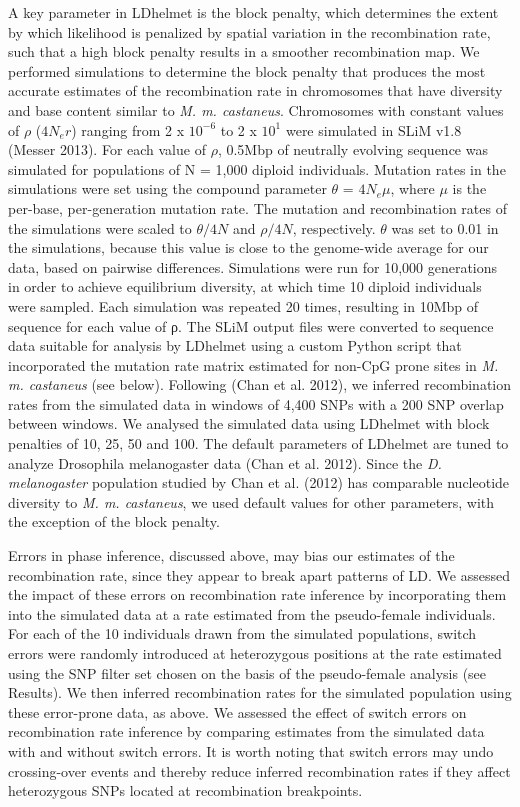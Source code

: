 	A key parameter in LDhelmet is the block penalty, which determines the extent by which likelihood is penalized by spatial variation in the recombination rate, such that a high block penalty results in a smoother recombination map. We performed simulations to determine the block penalty that produces the most accurate estimates of the recombination rate in chromosomes that have diversity and base content similar to \textit{M. m. castaneus}. Chromosomes with constant values of $\rho$ ($4N_er$) ranging from 2 x $10^{-6}$ to 2 x $10^1$ were simulated in SLiM v1.8 (Messer 2013). For each value of $\rho$, 0.5Mbp of neutrally evolving sequence was simulated for populations of N = 1,000 diploid individuals. Mutation rates in the simulations were set using the compound parameter $\theta$ = $4N_e\mu$, where $\mu$ is the per-base, per-generation mutation rate. The mutation and recombination rates of the simulations were scaled to $\theta /4N$ and $\rho /4N$, respectively. $\theta$ was set to 0.01 in the simulations, because this value is close to the genome-wide average for our data, based on pairwise differences. Simulations were run for 10,000 generations in order to achieve equilibrium diversity, at which time 10 diploid individuals were sampled. Each simulation was repeated 20 times, resulting in 10Mbp of sequence for each value of ρ. The SLiM output files were converted to sequence data suitable for analysis by LDhelmet using a custom Python script that incorporated the mutation rate matrix estimated for non-CpG prone sites in \textit{M. m. castaneus} (see below). Following (Chan et al. 2012), we inferred recombination rates from the simulated data in windows of 4,400 SNPs with a 200 SNP overlap between windows. We analysed the simulated data using LDhelmet with block penalties of 10, 25, 50 and 100. The default parameters of LDhelmet are tuned to analyze Drosophila melanogaster data (Chan et al. 2012). Since the \textit{D. melanogaster} population studied by Chan et al. (2012) has comparable nucleotide diversity to \textit{M. m. castaneus}, we used default values for other parameters, with the exception of the block penalty.
 
	Errors in phase inference, discussed above, may bias our estimates of the recombination rate, since they appear to break apart patterns of LD. We assessed the impact of these errors on recombination rate inference by incorporating them into the simulated data at a rate estimated from the pseudo-female individuals. For each of the 10 individuals drawn from the simulated populations, switch errors were randomly introduced at heterozygous positions at the rate estimated using the SNP filter set chosen on the basis of the pseudo-female analysis (see Results). We then inferred recombination rates for the simulated population using these error-prone data, as above. We assessed the effect of switch errors on recombination rate inference by comparing estimates from the simulated data with and without switch errors. It is worth noting that switch errors may undo crossing-over events and thereby reduce inferred recombination rates if they affect heterozygous SNPs located at recombination breakpoints.

